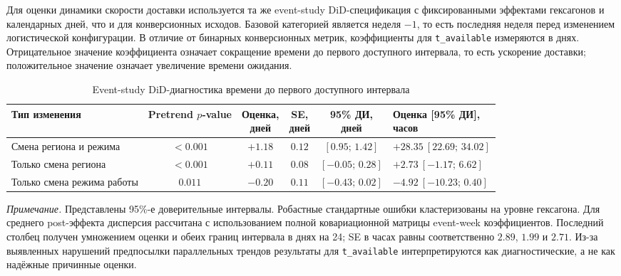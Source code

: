\documentclass[14pt,a4paper]{extarticle}
\begin{document}
Для оценки динамики скорости доставки используется та же event-study DiD-спецификация с фиксированными эффектами гексагонов и календарных дней, что и для конверсионных исходов. Базовой категорией является неделя \(-1\), то есть последняя неделя перед изменением логистической конфигурации. В отличие от бинарных конверсионных метрик, коэффициенты для \texttt{t\_available} измеряются в днях. Отрицательное значение коэффициента означает сокращение времени до первого доступного интервала, то есть ускорение доставки; положительное значение означает увеличение времени ожидания.

\begin{table}[H]
\centering
\caption{Event-study DiD-диагностика времени до первого доступного интервала}
\label{tab:speed_did_summary}
\scriptsize
\setlength{\tabcolsep}{2.5pt}
\renewcommand{\arraystretch}{1.15}
\begin{tabularx}{\textwidth}{@{}>{\raggedright\arraybackslash}X c c c c >{\centering\arraybackslash}X@{}}
\toprule
Тип изменения &
\makecell{Pretrend\\$p$-value} &
\makecell{Оценка,\\дней} &
\makecell{SE,\\дней} &
\makecell{95\% ДИ,\\дней} &
\makecell{Оценка [95\% ДИ],\\часов} \\
\midrule
Смена региона и режима & \(<0.001\) & \(+1.18\) & \(0.12\) &
\([0.95;\,1.42]\) & \(+28.35\ [22.69;\,34.02]\) \\
Только смена региона & \(<0.001\) & \(+0.11\) & \(0.08\) &
\([-0.05;\,0.28]\) & \(+2.73\ [-1.17;\,6.62]\) \\
Только смена режима работы & \(0.011\) & \(-0.20\) & \(0.11\) &
\([-0.43;\,0.02]\) & \(-4.92\ [-10.23;\,0.40]\) \\
\bottomrule
\end{tabularx}
\begin{minipage}{0.98\textwidth}
\scriptsize
\textit{Примечание.} Представлены 95\%-е доверительные интервалы. Робастные
стандартные ошибки кластеризованы на уровне гексагона. Для среднего
post-эффекта дисперсия рассчитана с использованием полной ковариационной
матрицы event-week коэффициентов. Последний столбец получен умножением оценки
и обеих границ интервала в днях на 24; SE в часах равны соответственно
\(2.89\), \(1.99\) и \(2.71\). Из-за выявленных нарушений предпосылки
параллельных трендов результаты для \texttt{t\_available} интерпретируются как
диагностические, а не как надёжные причинные оценки.
\end{minipage}
\end{table}
\end{document}

